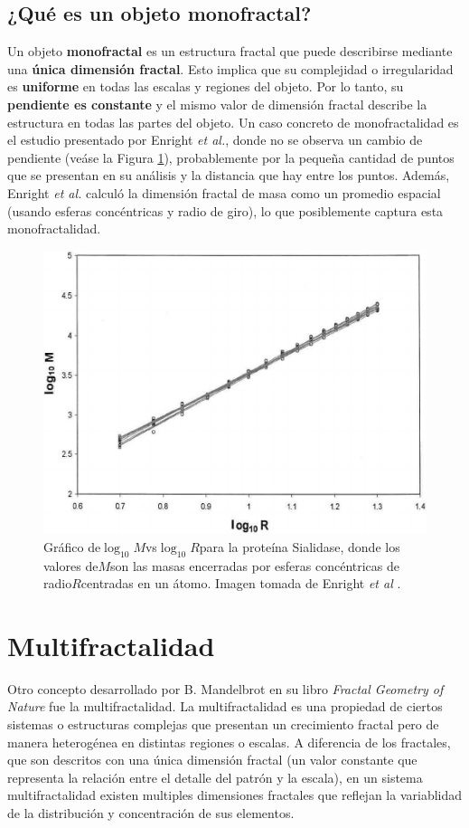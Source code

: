 \subsection*{¿Qu\'{e} es un objeto monofractal?}

Un objeto \textbf{monofractal} es un estructura fractal que puede describirse mediante una \textbf{\'{u}nica dimensi\'{o}n fractal}. Esto implica que su complejidad o irregularidad es \textbf{uniforme} en todas las escalas y regiones del objeto. Por lo tanto, su \textbf{pendiente es constante} y el mismo valor de dimensi\'{o}n fractal describe la estructura en todas las partes del objeto. Un caso concreto de monofractalidad es el estudio presentado por Enright \textit{et al.}\cite{Enright2005}, donde no se observa un cambio de pendiente (ve\'{a}se la Figura \ref{fig:Enright-Fractal}), probablemente por la pequeña cantidad de puntos que se presentan en su an\'{a}lisis y la distancia que hay entre los puntos. Adem\'{a}s, Enright \textit{et al.} calcul\'{o} la dimensi\'{o}n fractal de masa como un promedio espacial (usando esferas conc\'{e}ntricas y radio de giro), lo que posiblemente captura esta monofractalidad.

\begin{figure}[H]
	\begin{center}
		\includegraphics[width=0.4\linewidth]{graphs/Enright2005}
		\caption{Gr\'{a}fico de$\log_{10}M$vs$\log_{10}R$para la prote\'{i}na Sialidase, donde los valores de$M$son las masas encerradas por esferas conc\'{e}ntricas de radio$R$centradas en un \'{a}tomo. Imagen tomada de Enright \textit{et al} \cite{Enright2005}.}
		\label{fig:Enright-Fractal}
	\end{center}
\end{figure}

\section{Multifractalidad}

Otro concepto desarrollado por B. Mandelbrot en su libro \textit{Fractal Geometry of Nature} fue la multifractalidad. La multifractalidad es una propiedad de ciertos sistemas o estructuras complejas que presentan un crecimiento fractal pero de manera heterog\'{e}nea en distintas regiones o escalas. A diferencia de los fractales, que son descritos con una \'{u}nica dimensi\'{o}n fractal (un valor constante que representa la relaci\'{o}n entre el detalle del patr\'{o}n y la escala), en un sistema multifractalidad existen multiples dimensiones fractales que reflejan la variablidad de la distribuci\'{o}n y concentraci\'{o}n de sus elementos. 


